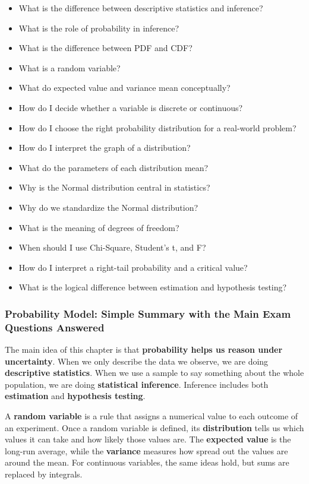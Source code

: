 \documentclass[11pt]{article}
\theoremstyle{smallexample}
\begin{document}
\begin{itemize}
    \item What is the difference between descriptive statistics and inference?
    \item What is the role of probability in inference?
    \item What is the difference between PDF and CDF?
    \item What is a random variable?
    \item What do expected value and variance mean conceptually?
    \item How do I decide whether a variable is discrete or continuous?
    \item How do I choose the right probability distribution for a real-world problem?
    \item How do I interpret the graph of a distribution?
    \item What do the parameters of each distribution mean?
    \item Why is the Normal distribution central in statistics?
    \item Why do we standardize the Normal distribution?
    \item What is the meaning of degrees of freedom?
    \item When should I use Chi-Square, Student's t, and F?
    \item How do I interpret a right-tail probability and a critical value?
    \item What is the logical difference between estimation and hypothesis testing?
\end{itemize}

\subsubsection{Probability Model: Simple Summary with the Main Exam Questions Answered}

The main idea of this chapter is that \textbf{probability helps us reason under uncertainty}. When we only describe the data we observe, we are doing \textbf{descriptive statistics}. When we use a sample to say something about the whole population, we are doing \textbf{statistical inference}. Inference includes both \textbf{estimation} and \textbf{hypothesis testing}.

A \textbf{random variable} is a rule that assigns a numerical value to each outcome of an experiment. Once a random variable is defined, its \textbf{distribution} tells us which values it can take and how likely those values are. The \textbf{expected value} is the long-run average, while the \textbf{variance} measures how spread out the values are around the mean. For continuous variables, the same ideas hold, but sums are replaced by integrals.
\end{document}
